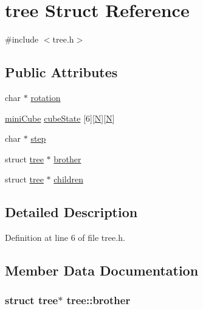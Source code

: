 \hypertarget{structtree}{\section{tree Struct Reference}
\label{structtree}
}


{\ttfamily \#include $<$tree.\-h$>$}

\subsection*{Public Attributes}
\begin{DoxyCompactItemize}
\item 
char $\ast$ \hyperlink{structtree_a32f3d9d990eda2f7dd4941ee8c42daae}{rotation}
\item 
\hyperlink{define_8h_aa8bf03849ba704a820a006ea0aeec180}{mini\-Cube} \hyperlink{structtree_a64a4cf7c5410c94da00989faeb3050f3}{cube\-State} \mbox{[}6\mbox{]}\mbox{[}\hyperlink{define_8h_a0240ac851181b84ac374872dc5434ee4}{N}\mbox{]}\mbox{[}\hyperlink{define_8h_a0240ac851181b84ac374872dc5434ee4}{N}\mbox{]}
\item 
char $\ast$ \hyperlink{structtree_af079d2aa4e7d5e37d47749e6a6e66602}{step}
\item 
struct \hyperlink{structtree}{tree} $\ast$ \hyperlink{structtree_a5899a1537e86023eb6edeac6277e0ee9}{brother}
\item 
struct \hyperlink{structtree}{tree} $\ast$ \hyperlink{structtree_a3d696acca71e630b72bc38b56998c926}{children}
\end{DoxyCompactItemize}


\subsection{Detailed Description}


Definition at line 6 of file tree.\-h.



\subsection{Member Data Documentation}
\hypertarget{structtree_a5899a1537e86023eb6edeac6277e0ee9}{
\subsubsection[{brother}]{\setlength{\rightskip}{0pt plus 5cm}struct {\bf tree}$\ast$ tree\-::brother}}\label{structtree_a5899a1537e86023eb6edeac6277e0ee9}


